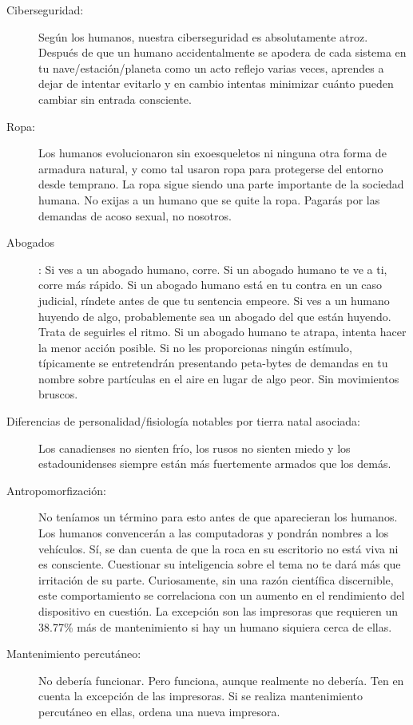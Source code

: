 \documentclass[spanish,12pt,a4paper, oneside]{book}
\begin{document}
\begin{description}
        \item[Ciberseguridad:] Según los humanos, nuestra ciberseguridad es absolutamente atroz. Después de que un humano accidentalmente se apodera de cada sistema en tu nave/estación/planeta como un acto reflejo varias veces, aprendes a dejar de intentar evitarlo y en cambio intentas minimizar cuánto pueden cambiar sin entrada consciente.

        \item[Ropa:] Los humanos evolucionaron sin exoesqueletos ni ninguna otra forma de armadura natural, y como tal usaron ropa para protegerse del entorno desde temprano. La ropa sigue siendo una parte importante de la sociedad humana. No exijas a un humano que se quite la ropa. Pagarás por las demandas de acoso sexual, no nosotros.

        \item[Abogados]: Si ves a un abogado humano, corre. Si un abogado humano te ve a ti, corre más rápido. Si un abogado humano está en tu contra en un caso judicial, ríndete antes de que tu sentencia empeore. Si ves a un humano huyendo de algo, probablemente sea un abogado del que están huyendo. Trata de seguirles el ritmo. Si un abogado humano te atrapa, intenta hacer la menor acción posible. Si no les proporcionas ningún estímulo, típicamente se entretendrán presentando peta-bytes de demandas en tu nombre sobre partículas en el aire en lugar de algo peor. Sin movimientos bruscos.

        \item[Diferencias de personalidad/fisiología notables por tierra natal asociada:] Los canadienses no sienten frío, los rusos no sienten miedo y los estadounidenses siempre están más fuertemente armados que los demás.

        \item[Antropomorfización:] No teníamos un término para esto antes de que aparecieran los humanos. Los humanos convencerán a las computadoras y pondrán nombres a los vehículos. Sí, se dan cuenta de que la roca en su escritorio no está viva ni es consciente. Cuestionar su inteligencia sobre el tema no te dará más que irritación de su parte. Curiosamente, sin una razón científica discernible, este comportamiento se correlaciona con un aumento en el rendimiento del dispositivo en cuestión. La excepción son las impresoras que requieren un 38.77\% más de mantenimiento si hay un humano siquiera cerca de ellas.

        \item[Mantenimiento percutáneo:] No debería funcionar. Pero funciona, aunque realmente no debería. Ten en cuenta la excepción de las impresoras. Si se realiza mantenimiento percutáneo en ellas, ordena una nueva impresora.


\end{description}
\end{document}
